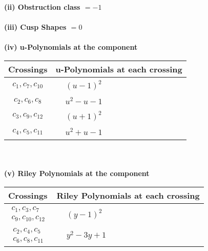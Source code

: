 \documentclass[1p]{elsarticle_modified}
\theoremstyle{definition}
\begin{document}
\flushleft \textbf{(ii) Obstruction class $= -1$}\\~\\
\flushleft \textbf{(iii) Cusp Shapes $= 0$}\\~\\
\newpage\renewcommand{\arraystretch}{1}
\flushleft \textbf{(iv) u-Polynomials at the component}\newline \\
\begin{tabular}{m{50pt}|m{274pt}}
Crossings & \hspace{64pt}u-Polynomials at each crossing \\
\hline $$\begin{aligned}c_{1},c_{7},c_{10}\end{aligned}$$&$\begin{aligned}
&(u-1)^2
\end{aligned}$\\
\hline $$\begin{aligned}c_{2},c_{6},c_{8}\end{aligned}$$&$\begin{aligned}
&u^2- u-1
\end{aligned}$\\
\hline $$\begin{aligned}c_{3},c_{9},c_{12}\end{aligned}$$&$\begin{aligned}
&(u+1)^2
\end{aligned}$\\
\hline $$\begin{aligned}c_{4},c_{5},c_{11}\end{aligned}$$&$\begin{aligned}
&u^2+u-1
\end{aligned}$\\
\hline
\end{tabular}\\~\\
\newpage\renewcommand{\arraystretch}{1}
\flushleft \textbf{(v) Riley Polynomials at the component}\newline \\
\begin{tabular}{m{50pt}|m{274pt}}
Crossings & \hspace{64pt}Riley Polynomials at each crossing \\
\hline $$\begin{aligned}c_{1},c_{3},c_{7}\\c_{9},c_{10},c_{12}\end{aligned}$$&$\begin{aligned}
&(y-1)^2
\end{aligned}$\\
\hline $$\begin{aligned}c_{2},c_{4},c_{5}\\c_{6},c_{8},c_{11}\end{aligned}$$&$\begin{aligned}
&y^2-3 y+1
\end{aligned}$\\
\hline
\end{tabular}\\~\\
\end{document}
